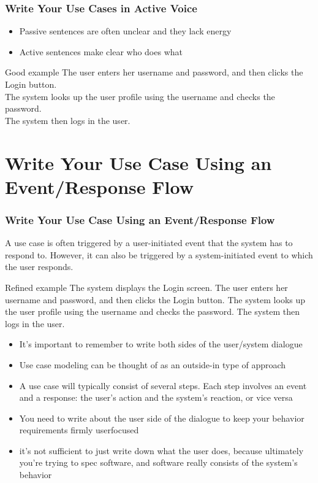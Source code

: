 \documentclass{beamer}
\begin{document}
\begin{frame}
  \frametitle{Write Your Use Cases in Active Voice}
      \begin{itemize}
        \item Passive sentences are often unclear and they lack energy
        \item Active sentences make clear who does what
      \end{itemize}
      \begin{block}{Good example}
      The user enters her username and password, and then clicks the Login
      button.\\ 
      The system looks up the user profile using the username and
      checks the password. \\
      The system then logs in the user.
      \end{block}
 \end{frame}

\section{Write Your Use Case Using an Event/Response Flow}
 
\begin{frame}
  \frametitle{Write Your Use Case Using an Event/Response Flow}
A use case is often triggered by a user-initiated event that the system has to 
respond to. However, it can also be triggered by a system-initiated event to
which the user responds.\\ 
      \begin{block}{Refined example}
      The system displays the Login screen. The user enters her username and password, and
then clicks the Login button. The system looks up the user profile using the username
and checks the password. The system then logs in the user.
      \end{block}
 \end{frame}
\begin{frame}
\begin{itemize}
        \item It’s important to remember to write both sides of the user/system dialogue
        \item Use case modeling can be thought of as an outside-in type of approach
        \item A use case will typically consist of several steps.
			Each step involves an event and a response: the user’s action and the
		system’s reaction, or vice versa
        \item You need to write about the user side of the dialogue to keep
        your behavior requirements firmly userfocused
        \item it’s not sufficient to just write down what the user does, because ultimately
you’re trying to spec software, and software really consists of the system’s behavior
      \end{itemize}
\end{frame}
\end{document}
